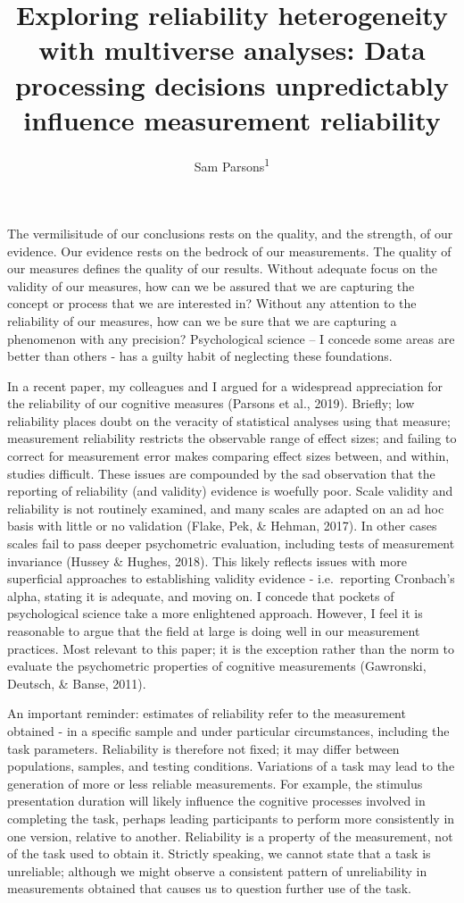 \documentclass[english,man,floatsintext]{apa6}
\author{Sam Parsons\textsuperscript{1}}
\affiliation{
\vspace{0.5cm}
\textsuperscript{1} University of Oxford}
\title{Exploring reliability heterogeneity with multiverse analyses: Data processing decisions unpredictably influence measurement reliability}
\date{}
\begin{document}
\maketitle

The vermilisitude of our conclusions rests on the quality, and the strength, of our evidence. Our evidence rests on the bedrock of our measurements. The quality of our measures defines the quality of our results. Without adequate focus on the validity of our measures, how can we be assured that we are capturing the concept or process that we are interested in? Without any attention to the reliability of our measures, how can we be sure that we are capturing a phenomenon with any precision? Psychological science -- I concede some areas are better than others - has a guilty habit of neglecting these foundations.

In a recent paper, my colleagues and I argued for a widespread appreciation for the reliability of our cognitive measures (Parsons et al., 2019). Briefly; low reliability places doubt on the veracity of statistical analyses using that measure; measurement reliability restricts the observable range of effect sizes; and failing to correct for measurement error makes comparing effect sizes between, and within, studies difficult. These issues are compounded by the sad observation that the reporting of reliability (and validity) evidence is woefully poor. Scale validity and reliability is not routinely examined, and many scales are adapted on an ad hoc basis with little or no validation (Flake, Pek, \& Hehman, 2017). In other cases scales fail to pass deeper psychometric evaluation, including tests of measurement invariance (Hussey \& Hughes, 2018). This likely reflects issues with more superficial approaches to establishing validity evidence - i.e.~reporting Cronbach's alpha, stating it is adequate, and moving on. I concede that pockets of psychological science take a more enlightened approach. However, I feel it is reasonable to argue that the field at large is doing well in our measurement practices. Most relevant to this paper; it is the exception rather than the norm to evaluate the psychometric properties of cognitive measurements (Gawronski, Deutsch, \& Banse, 2011).

An important reminder: estimates of reliability refer to the measurement obtained - in a specific sample and under particular circumstances, including the task parameters. Reliability is therefore not fixed; it may differ between populations, samples, and testing conditions. Variations of a task may lead to the generation of more or less reliable measurements. For example, the stimulus presentation duration will likely influence the cognitive processes involved in completing the task, perhaps leading participants to perform more consistently in one version, relative to another. Reliability is a property of the measurement, not of the task used to obtain it. Strictly speaking, we cannot state that a task is unreliable; although we might observe a consistent pattern of unreliability in measurements obtained that causes us to question further use of the task.
\end{document}
